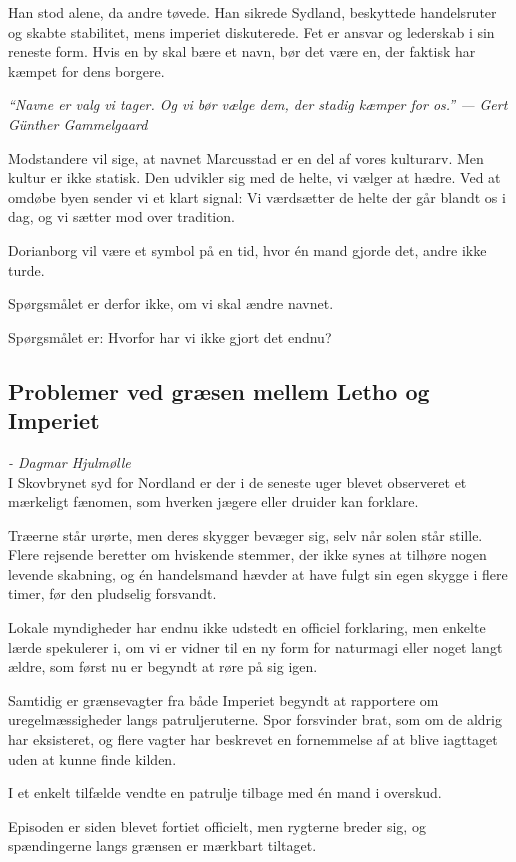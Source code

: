 \documentclass[letterpaper,12pt]{memoir}
\newenvironment{pullquote}
  {\begin{tcolorbox}[enhanced, breakable]\itshape\large}
  {\end{tcolorbox}}
\begin{document}
Han stod alene, da andre tøvede. Han sikrede Sydland, beskyttede handelsruter og skabte stabilitet, mens imperiet diskuterede. Fet er ansvar og lederskab i sin reneste form. Hvis en by skal bære et navn, bør det være en, der faktisk har kæmpet for dens borgere.

\begin{pullquote}
“Navne er valg vi tager. Og vi bør vælge dem, der stadig kæmper for os.”
— Gert Günther Gammelgaard
\end{pullquote}

Modstandere vil sige, at navnet Marcusstad er en del af vores kulturarv. Men kultur er ikke statisk. Den udvikler sig med de helte, vi vælger at hædre. Ved at omdøbe byen sender vi et klart signal: Vi værdsætter de helte der går blandt os i dag, og vi sætter mod over tradition.

Dorianborg vil være et symbol på en tid, hvor én mand gjorde det, andre ikke turde.

Spørgsmålet er derfor ikke, om vi skal ændre navnet.

Spørgsmålet er: Hvorfor har vi ikke gjort det endnu?
\par\medskip
\subsection*{Problemer ved græsen mellem Letho og Imperiet}
\textit{- Dagmar Hjulmølle}\\
I Skovbrynet syd for Nordland er der i de seneste uger blevet observeret et mærkeligt fænomen, som hverken jægere eller druider kan forklare. 
\par\medskip
Træerne står urørte, men deres skygger bevæger sig, selv når solen står stille. Flere rejsende beretter om hviskende stemmer, der ikke synes at tilhøre nogen levende skabning, og én handelsmand hævder at have fulgt sin egen skygge i flere timer, før den pludselig forsvandt. 
\par\medskip
Lokale myndigheder har endnu ikke udstedt en officiel forklaring, men enkelte lærde spekulerer i, om vi er vidner til en ny form for naturmagi eller noget langt ældre, som først nu er begyndt at røre på sig igen.
\par\medskip
Samtidig er grænsevagter fra både Imperiet begyndt at rapportere om uregelmæssigheder langs patruljeruterne. Spor forsvinder brat, som om de aldrig har eksisteret, og flere vagter har beskrevet en fornemmelse af at blive iagttaget uden at kunne finde kilden. 
\par\medskip
I et enkelt tilfælde vendte en patrulje tilbage med én mand i overskud. 
\par\medskip
Episoden er siden blevet fortiet officielt, men rygterne breder sig, og spændingerne langs grænsen er mærkbart tiltaget.
\newpage
\end{document}
